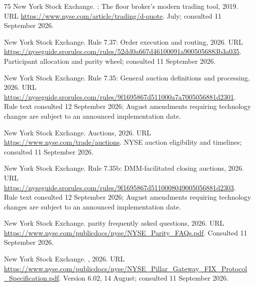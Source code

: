 \documentclass[11pt]{article}
\numberwithin{equation}{section}
\theoremstyle{definition}
\theoremstyle{remark}
\theoremstyle{definition}
\begin{document}
\begin{thebibliography}{75}
{New York Stock Exchange}.
: The floor broker's modern trading tool, 2019.
\newblock URL \url{https://www.nyse.com/article/trading/d-quote}.
 July; consulted 11 September 2026.

{New York Stock Exchange}.
\newblock Rule 7.37: Order execution and routing, 2026{}.
\newblock URL
  \url{https://nyseguide.srorules.com/rules/52dd0a667d46100091a9005056883b3a035}.
\newblock Participant allocation and parity wheel; consulted 11 September 2026.

{New York Stock Exchange}.
\newblock Rule 7.35: General auction definitions and processing,
  2026{}.
\newblock URL
  \url{https://nyseguide.srorules.com/rules/9f1695867d511000a7a7005056881d2301}.
\newblock Rule text consulted 12 September 2026; August amendments requiring
  technology changes are subject to an announced implementation date.

{New York Stock Exchange}.
\newblock Auctions, 2026{}.
\newblock URL \url{https://www.nyse.com/trade/auctions}.
\newblock NYSE auction eligibility and timelines; consulted 11 September 2026.

{New York Stock Exchange}.
\newblock Rule 7.35b: {DMM}-facilitated closing auctions, 2026{}.
\newblock URL
  \url{https://nyseguide.srorules.com/rules/9f1695867d5110008049005056881d2303}.
\newblock Rule text consulted 12 September 2026; August amendments requiring
  technology changes are subject to an announced implementation date.

{New York Stock Exchange}.
 parity frequently asked questions, 2026{}.
\newblock URL \url{https://www.nyse.com/publicdocs/nyse/NYSE_Parity_FAQs.pdf}.
\newblock Consulted 11 September 2026.

{New York Stock Exchange}.
, 2026{}.
\newblock URL
  \url{https://www.nyse.com/publicdocs/nyse/NYSE_Pillar_Gateway_FIX_Protocol_Specification.pdf}.
\newblock Version 6.02, 14 August; consulted 11 September 2026.


\end{thebibliography}
\end{document}
